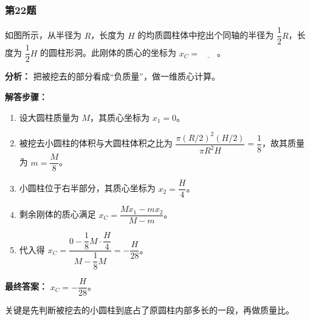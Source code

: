 \documentclass[12pt,a4paper]{ctexart}
\begin{document}
\subsubsection*{第22题}
\begin{tcolorbox}[colback=gray!2!white,colframe=black!60,title={题目}]
如图所示，从半径为 \(R\)，长度为 \(H\) 的均质圆柱体中挖出个同轴的半径为 \(\dfrac{1}{2}R\)，长度为 \(\dfrac{1}{2}H\) 的圆柱形洞。此刚体的质心的坐标为 \(x_C=\underline{\qquad}\)。\par
\end{tcolorbox}
\begin{tcolorbox}[colback=blue!2!white,colframe=blue!55!black,title={完整答案}]
\textbf{分析：}
把被挖去的部分看成“负质量”，做一维质心计算。\par
\textbf{解答步骤：}
\begin{enumerate}
\item 设大圆柱质量为 \(M\)，其质心坐标为 \(x_1=0\)。
\item 被挖去小圆柱的体积与大圆柱体积之比为 \(\dfrac{\pi (R/2)^2(H/2)}{\pi R^2H}=\dfrac18\)，故其质量为 \(m=\dfrac{M}{8}\)。
\item 小圆柱位于右半部分，其质心坐标为 \(x_2=\dfrac{H}{4}\)。
\item 剩余刚体的质心满足 \(x_C=\dfrac{Mx_1-mx_2}{M-m}\)。
\item 代入得 \(x_C=\dfrac{0-\dfrac18 M\cdot \dfrac{H}{4}}{M-\dfrac18 M}=-\dfrac{H}{28}\)。
\end{enumerate}
\textbf{最终答案：}
\(x_C=-\dfrac{H}{28}\)。\par
\end{tcolorbox}
\begin{tcolorbox}[colback=red!2!white,colframe=red!55!black,title={易错点}]
关键是先判断被挖去的小圆柱到底占了原圆柱内部多长的一段，再做质量比。\par
\end{tcolorbox}
\end{document}
